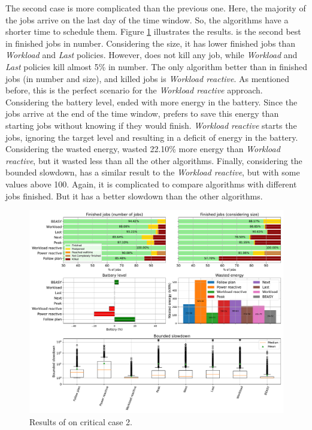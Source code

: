 The second case is more complicated than the previous one. Here, the majority of the jobs arrive on the last day of the time window. So, the algorithms have a shorter time to schedule them. Figure \ref{fig:beasy_critical_2} illustrates the results. \emph{\systemName} is the second best in finished jobs in number. Considering the size, it has lower finished jobs than \emph{Workload} and \emph{Last} policies. However, \emph{\systemName} does not kill any job, while \emph{Workload} and \emph{Last} policies kill almost 5\% in number. The only algorithm better than \emph{\systemName} in finished jobs (in number and size), and killed jobs is \emph{Workload reactive}. As mentioned before, this is the perfect scenario for the \emph{Workload reactive} approach. Considering the battery level, \emph{\systemName} ended with more energy in the battery. Since the jobs arrive at the end of the time window, \emph{\systemName} prefers to save this energy than starting jobs without knowing if they would finish. \emph{Workload reactive} starts the jobs, ignoring the target level and resulting in a deficit of energy in the battery. Considering the wasted energy, \emph{\systemName} wasted 22.10\% more energy than \emph{Workload reactive}, but it wasted less than all the other algorithms. Finally, considering the bounded slowdown, \emph{\systemName} has a similar result to the \emph{Workload reactive}, but with some values above 100. Again, it is complicated to compare algorithms with different jobs finished. But it has a better slowdown than the other algorithms.
 
\begin{figure}[!htb]
    \centering
    \includegraphics[scale=0.39]{Images/Heuristic/profile_best_workload_2_with_noise.pdf}
    \caption{Results of \emph{\systemName} on critical case 2.}
    \label{fig:beasy_critical_2}
\end{figure}

